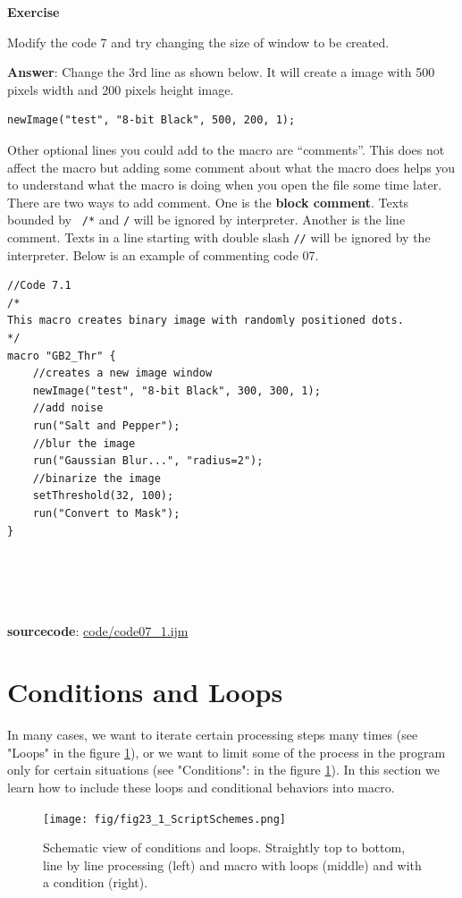 \documentclass[11pt,a4paper,oneside]{report}
\newenvironment{indentexercise}[1]
{{\setlength{\leftmargin}{2em}}
\textbf{Exercise \thesubsection-#1}
\begin{list}{}
	\item
}
{\end{list}}
\newcommand{\ilcom}[1]{\texttt{\small#1}}
\begin{document}
\begin{indentexercise}{1}
Modify the code 7 and try changing the size of window to be created.

\item \textbf{Answer}: Change the 3rd line as shown below. It will create a image with 500 pixels width and 200 pixels height image.  
	\begin{lstlisting}[numbers=none]
		newImage("test", "8-bit Black", 500, 200, 1);
	\end{lstlisting}
\end{indentexercise}

Other optional lines you could add to the macro are ``comments''. This does not affect the macro but adding some comment about what the macro does helps you to understand what the macro is doing when you open the file some time later. There are two ways to add comment. One is the \textbf{block comment}. Texts bounded by \ilcom{ /*} and \ilcom{*/} will be ignored by interpreter. Another is the line comment. Texts in a line starting with double slash \ilcom{//} will be ignored by the interpreter. Below is an example of commenting code 07. 


\begin{lstlisting}
//Code 7.1
/*  
This macro creates binary image with randomly positioned dots.  
*/
macro "GB2_Thr" {
	//creates a new image window
	newImage("test", "8-bit Black", 300, 300, 1);
	//add noise
	run("Salt and Pepper");
	//blur the image
	run("Gaussian Blur...", "radius=2");
	//binarize the image
	setThreshold(32, 100);
	run("Convert to Mask");
}





\end{lstlisting}
\textbf{sourcecode}: \href{http://www.example.com/contents}{code/code07\_1.ijm}
 
\newpage

\section{Conditions and Loops}
	In many cases, we want to iterate certain processing steps many times (see "Loops" in the figure \ref{fig_scriptscheme}), or we want to limit some of the process in the program only for certain situations (see "Conditions": in the figure \ref{fig_scriptscheme}). In this section we learn how to include these loops and conditional behaviors into macro. 

\begin{figure}[htbp]
\begin{center}
\texttt{[image: fig/fig23\_1\_ScriptSchemes.png]}
\caption{Schematic view of conditions and loops. Straightly top to bottom, line by line processing (left) and macro with loops (middle) and with a condition (right).} \label{fig_scriptscheme}
\end{center}
\end{figure}
\end{document}
